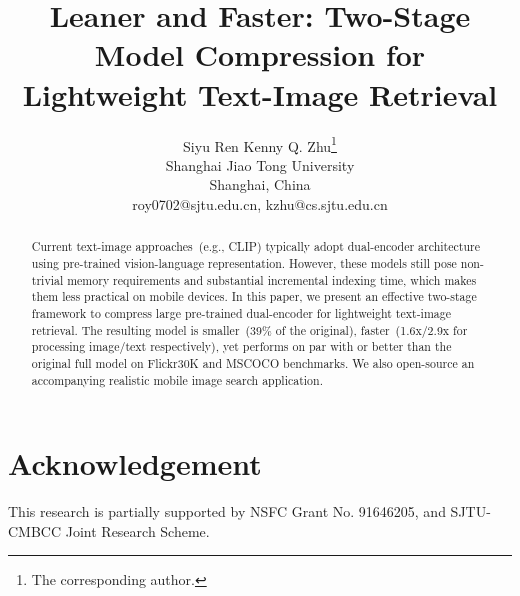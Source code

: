 \documentclass[11pt]{article}
\title{Leaner and Faster: Two-Stage Model Compression for Lightweight Text-Image Retrieval}
\author{Siyu Ren \hspace*{1cm} Kenny Q. Zhu\textsuperscript{\rm}\thanks{\hspace{2mm}The 
corresponding author.}\\
	Shanghai Jiao Tong University\\
	Shanghai, China\\
	roy0702@sjtu.edu.cn, kzhu@cs.sjtu.edu.cn}
\begin{document}
\maketitle
\begin{abstract}
Current text-image approaches~(e.g., CLIP) typically adopt dual-encoder architecture 
using pre-trained vision-language representation. 
However, these models still pose non-trivial memory requirements and 
substantial incremental indexing time, which makes them less practical on
mobile devices. In this paper, we present an effective two-stage framework 
to compress large pre-trained dual-encoder for lightweight text-image retrieval. 
The resulting model is smaller~(39\% of the original), 
faster~(1.6x/2.9x for processing image/text respectively), yet performs on par with or better than the original full model on Flickr30K and MSCOCO benchmarks. 
We also open-source an accompanying realistic mobile image search application.\end{abstract}






\section*{Acknowledgement}
This research is partially supported by NSFC Grant No. 91646205, and SJTU-CMBCC Joint Research Scheme.


\end{document}
